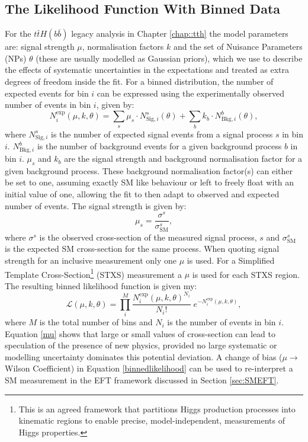 \subsection{The Likelihood Function With Binned Data}
For the $t\bar{t}H(b\bar{b})$ legacy analysis in Chapter \ref{chap::tth} the model parameters are: signal strength $\mu$, normalisation factors $k$ and the set of Nuisance Parameters (NPs) $\theta$ (these are usually modelled as Gaussian priors), which we use to describe the effects of systematic uncertainties in the expectations and treated as extra degrees of freedom inside the fit. For a binned distribution, the number of expected events for bin $i$ can be expressed using the experimentally observed number of events in bin $i$, given by:
\begin{equation}
    N_i^{\text{exp}}(\mu,k,\theta)= \sum_s \mu_s \cdot N_{\text{Sig},i}^s (\theta) + \sum_b k_b \cdot N_{\text{Bkg},i}^b (\theta), 
\end{equation}
where $N_{\text{Sig},i}^s$ is the number of expected signal events from a signal process $s$ in bin $i$. $N_{\text{Bkg},i}^b$ is the number of background events for a given background process $b$ in bin $i$. $\mu_s$ and $k_b$ are the signal strength and background normalisation factor for a given background process. These background normalisation factor(s) can either be set to one, assuming exactly SM like behaviour or left to freely float with an initial value of one, allowing the fit to then adapt to observed and expected number of events. The signal strength is given by:
\begin{equation}
    \label{mu}
    \mu_s = \frac{\sigma^s}{\sigma_{\text{SM}}^s},
\end{equation}
where $\sigma^s$ is the observed cross-section of the measured signal process, $s$ and $\sigma_{\text{SM}}^s$ is the expected SM cross-section for the same process. When quoting signal strength for an inclusive measurement only one $\mu$ is used. For a Simplified Template Cross-Section\footnote{This is an agreed framework that partitions Higgs production processes into kinematic regions to enable precise, model-independent, measurements of Higgs properties.} (STXS) measurement a $\mu$ is used for each STXS region. The resulting binned likelihood function is given my:
\begin{equation}\label{binnedlikelihood}
    \mathcal{L}(\mu,k,\theta) = \prod_i^M\frac{N^{\mathrm{exp}}_i(\mu, k, \theta)^{N_i}}{N_i!} \; e^{-N^{\mathrm{exp}}_i(\mu, k, \theta)},
\end{equation}
where $M$ is the total number of bins and $N_i$ is the number of events in bin $i$. Equation \ref{mu} shows that large or small values of cross-section can lead to speculation of the presence of new physics, provided no large systematic or modelling uncertainty dominates this potential deviation. A change of bias ($\mu \rightarrow$Wilson Coefficient) in Equation \ref{binnedlikelihood} can be used to re-interpret a SM measurement in the EFT framework discussed in Section \ref{sec:SMEFT}.
